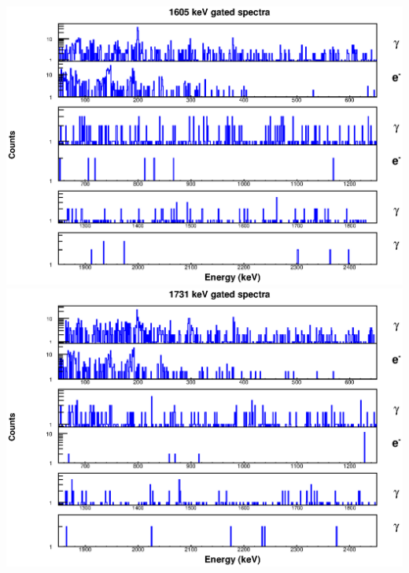 \includegraphics[scale=0.8]{156Gd_Appendix/1605_combined.eps}
\includegraphics[scale=0.8]{156Gd_Appendix/1731_combined.eps}
